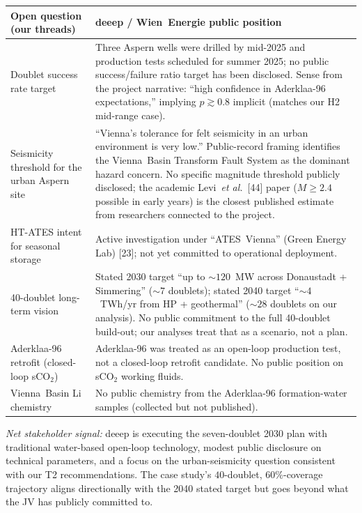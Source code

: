 \documentclass{article}
\begin{document}
\begin{center}
\begin{tabular}{p{}p{}}
\hline
\textbf{Open question (our threads)} & \textbf{deeep / Wien~Energie public position} \\
\hline
Doublet success rate target & Three Aspern wells were drilled by mid-2025 and
production tests scheduled for summer 2025; no public success/failure ratio
target has been disclosed. Sense from the project narrative: ``high
confidence in Aderklaa-96 expectations,'' implying $p \gtrsim 0.8$
implicit (matches our H2 mid-range case). \\
Seismicity threshold for the urban Aspern site & ``Vienna's tolerance
for felt seismicity in an urban environment is very low.''
Public-record framing identifies the Vienna~Basin Transform Fault
System as the dominant hazard concern. No specific magnitude threshold
publicly disclosed; the academic Levi~\emph{et al.}\ [44] paper
($M\geq 2.4$ possible in early years) is the closest published
estimate from researchers connected to the project. \\
HT-ATES intent for seasonal storage & Active investigation under
``ATES~Vienna'' (Green Energy Lab) [23]; not yet committed to
operational deployment. \\
40-doublet long-term vision & Stated 2030 target ``up to $\sim 120$~MW
across Donaustadt + Simmering'' ($\sim 7$ doublets); stated 2040
target ``$\sim 4$~TWh/yr from HP + geothermal'' ($\sim 28$ doublets
on our analysis). No public commitment to the full 40-doublet build-out;
our analyses treat that as a scenario, not a plan. \\
Aderklaa-96 retrofit (closed-loop sCO$_2$) & Aderklaa-96 was treated
as an open-loop production test, not a closed-loop retrofit candidate.
No public position on sCO$_2$ working fluids. \\
Vienna~Basin Li chemistry & No public chemistry from the Aderklaa-96
formation-water samples (collected but not published). \\
\hline
\end{tabular}
\end{center}

\emph{Net stakeholder signal:} deeep is executing the seven-doublet 2030
plan with traditional water-based open-loop technology, modest public
disclosure on technical parameters, and a focus on the urban-seismicity
question consistent with our T2 recommendations. The case study's
$40$-doublet, $60\%$-coverage trajectory aligns directionally with
the 2040 stated target but goes beyond what the JV has publicly
committed to.
\end{document}
